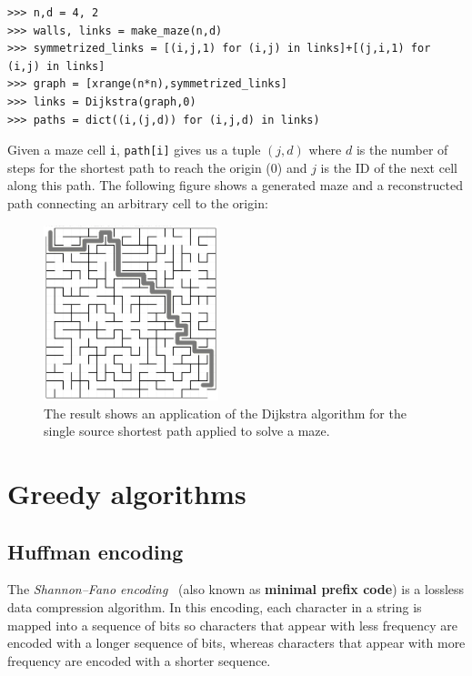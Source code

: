 \documentclass[justified,sixbynine]{tufte-book}
\def\ft{\small\tt}
\theoremstyle{plain}%
\theoremstyle{definition}
\theoremstyle{remark}
\begin{document}
\begin{fullwidth}
\begin{lstlisting}
>>> n,d = 4, 2
>>> walls, links = make_maze(n,d)
>>> symmetrized_links = [(i,j,1) for (i,j) in links]+[(j,i,1) for (i,j) in links]
>>> graph = [xrange(n*n),symmetrized_links]
>>> links = Dijkstra(graph,0)
>>> paths = dict((i,(j,d)) for (i,j,d) in links)
\end{lstlisting}

Given a maze cell {\ft i}, {\ft path[i]} gives us a tuple $(j, d)$ where $d$ is the number of steps for the shortest path to reach the origin (0) and $j$ is the ID of the next cell along this path.
The following figure shows a generated maze and a reconstructed path connecting an arbitrary cell to the origin:

\begin{figure}[ht]
\centering\includegraphics[width=2in]{images/maze2.png}
\caption{The result shows an application of the Dijkstra algorithm for the single source shortest path applied to solve a maze.}
\end{figure}

\goodbreak\section{Greedy algorithms}

\subsection{Huffman encoding}


The {\it Shannon--Fano encoding}~\cite{shannon}\cite{fano} (also known as {\bf minimal prefix code}) is a lossless data compression algorithm.
In this encoding, each character in a string is mapped into a sequence of bits
so characters that appear with less frequency are encoded with a longer
sequence of bits, whereas characters that appear with more frequency are
encoded with a shorter sequence.


\end{fullwidth}
\end{document}
